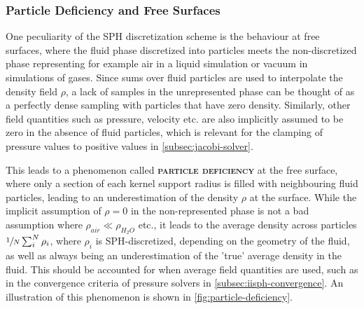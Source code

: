 \documentclass[oneside, a4paper]{book}
\newcommand\emphasis[1]{{\scshape\bfseries#1}}
\newcounter{phase}[algorithm]
\begin{document}
    \subsubsection{Particle Deficiency and Free Surfaces}\label{subsec:particle-deficiency}
    One peculiarity of the SPH discretization scheme is the behaviour at free surfaces, where the fluid phase discretized into particles meets the non-discretized phase representing for example air in a liquid simulation or vacuum in simulations of gases. Since sums over fluid particles are used to interpolate the density field $\rho$, a lack of samples in the unrepresented phase can be thought of as a perfectly dense sampling with particles that have zero density. Similarly, other field quantities such as pressure, velocity etc. are also implicitly assumed to be zero in the absence of fluid particles, which is relevant for the clamping of pressure values to positive values in \autoref{subsec:jacobi-solver}. 
    
    This leads to a phenomenon called \emphasis{particle deficiency} at the free surface, where only a section of each kernel support radius is filled with neighbouring fluid particles, leading to an underestimation of the density $\rho$ at the surface. While the implicit assumption of $\rho=0$ in the non-represented phase is not a bad assumption where $\rho_{air}\ll\rho_{H_2O}$ etc., it leads to the average density across particles $\sfrac{1}{N}\sum_i^N\rho_i$, where $\rho_i$ is SPH-discretized, depending on the geometry of the fluid, as well as always being an underestimation of the 'true' average density in the fluid. This should be accounted for when average field quantities are used, such as in the convergence criteria of pressure solvers in \autoref{subsec:iisph-convergence}. An illustration of this phenomenon is shown in \autoref{fig:particle-deficiency}.
\end{document}
